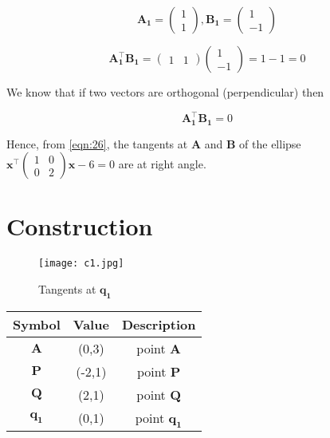 \documentclass[journal,10pt,twocolumn]{article}
\let\vec\mathbf
\newcommand{\myvec}[1]{\ensuremath{\begin{pmatrix}#1\end{pmatrix}}}
\begin{document}
    \begin{equation}
    \label{eqn:25}
        \vec{A_1} = \myvec{1 \\ 1} , \vec{B_1} = \myvec{1 \\ -1}
    \end{equation}
        
    \begin{equation}
    \label{eqn:26}
        \vec{A_1^\top}\vec{B_1} = \myvec{1 & 1}\myvec{1 \\ -1} = 1 - 1 = 0
    \end{equation}
    
    \begin{flushleft}
        We know that if two vectors are orthogonal (perpendicular) then
    \end{flushleft}
    
    \begin{equation}
    \label{eqn:27}
        \vec{A_1^\top}\vec{B_1} = 0
    \end{equation}
    
    \begin{flushleft}
        Hence, from \eqref{eqn:26}, the tangents at $\vec{A}$ and $\vec{B}$ of the ellipse $\vec{x^\top}\myvec{1 & 0 \\ 0 & 2}\vec{x} - 6 = 0$ are at right angle.
    \end{flushleft}
    
\section{Construction}

\begin{figure}[H]
    \centering
    \texttt{[image: c1.jpg]}
    \caption{Tangents at $\vec{q_1}$}
    \label{fig:Bisector}
\end{figure}

\begin{table}[h]
	\centering
\setlength\extrarowheight{2pt}
	\begin{tabular}{|c|c|c|}
		\hline
		\textbf{Symbol} & \textbf{Value} & \textbf{Description} \\
		\hline
		$\vec{A}$ & (0,3) & point $\vec{A}$\\
		\hline
		$\vec{P}$ & (-2,1) & point $\vec{P}$\\
		\hline
		$\vec{Q}$ & (2,1) & point $\vec{Q}$\\
		\hline
		$\vec{q_1}$ & (0,1) & point $\vec{q_1}$\\
		\hline
	\end{tabular}
\end{table}
\end{document}
